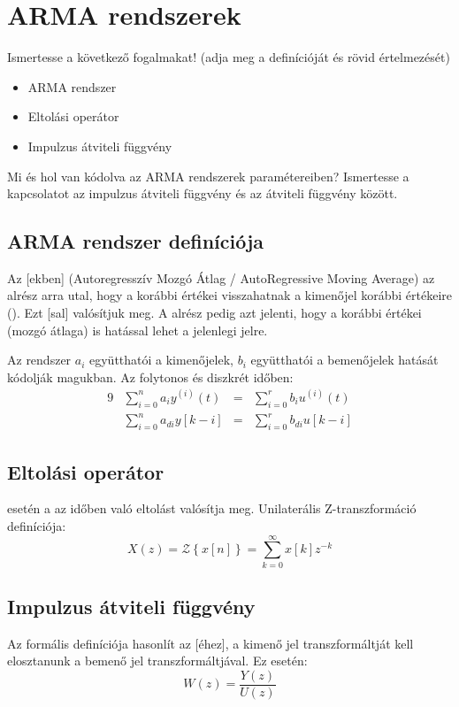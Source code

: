 \documentclass[../main.tex]{subfiles}
\begin{document}
\section{ARMA rendszerek}

\begin{fulltheorem}
  Ismertesse a következő fogalmakat!
  (adja meg a definícióját és rövid értelmezését)
  \begin{itemize}
    \item ARMA rendszer
    \item Eltolási operátor
    \item Impulzus átviteli függvény
  \end{itemize}
  Mi és hol van kódolva az ARMA rendszerek paramétereiben?
  Ismertesse a kapcsolatot az impulzus átviteli függvény és az átviteli függvény között.
\end{fulltheorem}

\subsection{ARMA rendszer definíciója}

Az [ekben] (Autoregresszív Mozgó Átlag / AutoRegressive Moving
Average) az  alrész arra utal, hogy a  korábbi értékei visszahatnak
a kimenőjel korábbi értékeire (). Ezt [sal]
valósítjuk meg. A  alrész pedig azt jelenti, hogy a  korábbi
értékei (mozgó átlaga) is hatással lehet a jelenlegi jelre.

Az  rendszer $a_i$ együtthatói a kimenőjelek, $b_i$ együtthatói a bemenőjelek
hatását kódolják magukban. Az  folytonos és diszkrét időben:
\begin{alignat*}{9}
   & \sum_{i=0}^n  a_i y^{(i)}(t) & = & \sum_{i=0}^r b_i u^{(i)}(t)
  \\
   & \sum_{i=0}^n  a_{di} y[k-i]  & = & \sum_{i=0}^r b_{di} u[k-i]
\end{alignat*}

\subsection{Eltolási operátor}

 esetén a  az időben való eltolást
valósítja meg. Unilaterális Z-transzformáció definíciója:
\[
  X(z)=\mathcal Z \left\{ x[n] \right\} = \sum_{k=0}^{\infty} x[k]z^{-k}
\]


\subsection{Impulzus átviteli függvény}

Az  formális definíciója hasonlít az
[éhez], a kimenő jel transzformáltját kell elosztanunk
a bemenő jel transzformáltjával. Ez  esetén:
\[
  W(z) = \frac{Y(z)}{U(z)}
\]
\end{document}
